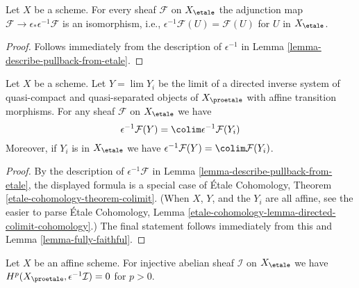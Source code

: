 \begin{lemma}
\label{lemma-fully-faithful}
Let $X$ be a scheme. For every sheaf $\mathcal{F}$ on $X_\etale$
the adjunction map $\mathcal{F} \to \epsilon_*\epsilon^{-1}\mathcal{F}$ is an
isomorphism, i.e., $\epsilon^{-1}\mathcal{F}(U) = \mathcal{F}(U)$
for $U$ in $X_\etale$.
\end{lemma}

\begin{proof}
Follows immediately from the description of
$\epsilon^{-1}$ in Lemma \ref{lemma-describe-pullback-from-etale}.
\end{proof}

\begin{lemma}
\label{lemma-limit-pullback}
Let $X$ be a scheme. Let $Y = \lim Y_i$ be the limit of a directed inverse
system of quasi-compact and quasi-separated objects of $X_\proetale$
with affine transition morphisms. For any sheaf $\mathcal{F}$ on $X_\etale$
we have
$$
\epsilon^{-1}\mathcal{F}(Y) = \colim \epsilon^{-1}\mathcal{F}(Y_i)
$$
Moreover, if $Y_i$ is in $X_\etale$ we have
$\epsilon^{-1}\mathcal{F}(Y) = \colim \mathcal{F}(Y_i)$.
\end{lemma}

\begin{proof}
By the description of $\epsilon^{-1}\mathcal{F}$ in
Lemma \ref{lemma-describe-pullback-from-etale}, the displayed formula
is a special case of \'Etale Cohomology, Theorem
\ref{etale-cohomology-theorem-colimit}.
(When $X$, $Y$, and the $Y_i$ are all affine, see
the easier to parse \'Etale Cohomology, Lemma
\ref{etale-cohomology-lemma-directed-colimit-cohomology}.)
The final statement follows immediately from this
and Lemma \ref{lemma-fully-faithful}.
\end{proof}

\begin{lemma}
\label{lemma-affine-vanishing}
Let $X$ be an affine scheme. For injective abelian sheaf $\mathcal{I}$ on
$X_\etale$ we have $H^p(X_\proetale, \epsilon^{-1}\mathcal{I}) = 0$
for $p > 0$.
\end{lemma}

